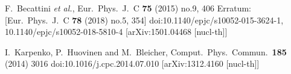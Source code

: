 \documentclass[12pt, a4paper]{report}
\begin{document}
\begin{thebibliography}{20}
	F.~Becattini {\it et al.},
	Eur.\ Phys.\ J.\ C {\bf 75} (2015) no.9,  406
	Erratum: [Eur.\ Phys.\ J.\ C {\bf 78} (2018) no.5,  354]
	doi:10.1140/epjc/s10052-015-3624-1, 10.1140/epjc/s10052-018-5810-4
	[arXiv:1501.04468 [nucl-th]]
	
	I.~Karpenko, P.~Huovinen and M.~Bleicher,
	Comput.\ Phys.\ Commun.\  {\bf 185} (2014) 3016
	doi:10.1016/j.cpc.2014.07.010
	[arXiv:1312.4160 [nucl-th]]
	
\end{thebibliography}
	
\end{document}

